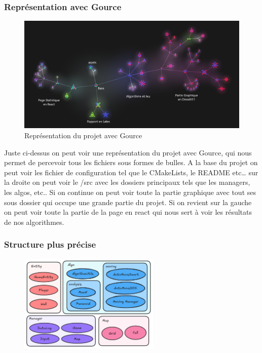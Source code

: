 \subsubsection{Représentation avec Gource}
\begin{figure}[h]
	\centering
	\includegraphics[width=1.0\textwidth]{images/GourceScreenFinal.png}
	\caption{Représentation du projet avec Gource}
	\label{GourceScreen}
\end{figure}
Juste ci-dessus on peut voir une représentation du projet avec Gource, qui nous permet de percevoir tous les fichiers sous formes de bulles. A la base du projet on peut voir les fichier de configuration tel que le CMakeLists, le README etc… sur la droite on peut voir le /src avec les dossiers principaux tels que les managers, les algos, etc.. Si on continue on peut voir toute la partie graphique avec tout ses sous dossier qui occupe une grande partie du projet. Si on revient sur la gauche on peut voir toute la partie de la page en react qui nous sert à voir les résultats de nos algorithmes.

\newpage

\subsubsection{Structure plus précise}
\begin{figure}
	\centering
	\includegraphics[width=0.6\textwidth]{images/ExcalidrawBase.png}
\end{figure}

